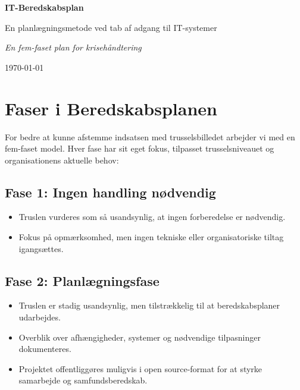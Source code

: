 \documentclass[a4paper,11pt,oneside]{book}
\newcommand{\doctitle}{IT-Beredskabsplan}
\def\tightlist{}
\begin{document}
\begin{titlepage}
    \centering
    \vspace*{2cm}
    {\Huge\bfseries \doctitle\par}
    \vspace{1cm}
    {\Large En planlægningsmetode ved tab af adgang til IT-systemer\par}
    \vspace{2cm}

    \vspace{2cm}
    {\Large\itshape En fem-faset plan for krisehåndtering\par}
    \vfill

    {\large \today}
\end{titlepage}

\frontmatter
\tableofcontents
\newpage

\mainmatter
\chapter{Faser i Beredskabsplanen}\label{faser-i-beredskabsplanen}

For bedre at kunne afstemme indsatsen med trusselsbilledet arbejder vi
med en fem-faset model. Hver fase har sit eget fokus, tilpasset
trusselsniveauet og organisationens aktuelle behov:

\section{Fase 1: Ingen handling
nødvendig}\label{fase-1-ingen-handling-nuxf8dvendig}

\begin{itemize}
\tightlist
\item
  Truslen vurderes som så usandsynlig, at ingen forberedelse er
  nødvendig.
\item
  Fokus på opmærksomhed, men ingen tekniske eller organisatoriske tiltag
  igangsættes.
\end{itemize}

\section{Fase 2: Planlægningsfase}\label{fase-2-planluxe6gningsfase}

\begin{itemize}
\tightlist
\item
  Truslen er stadig usandsynlig, men tilstrækkelig til at
  beredskabsplaner udarbejdes.
\item
  Overblik over afhængigheder, systemer og nødvendige tilpasninger
  dokumenteres.
\item
  Projektet offentliggøres muligvis i open source-format for at styrke
  samarbejde og samfundsberedskab.
\end{itemize}
\end{document}
